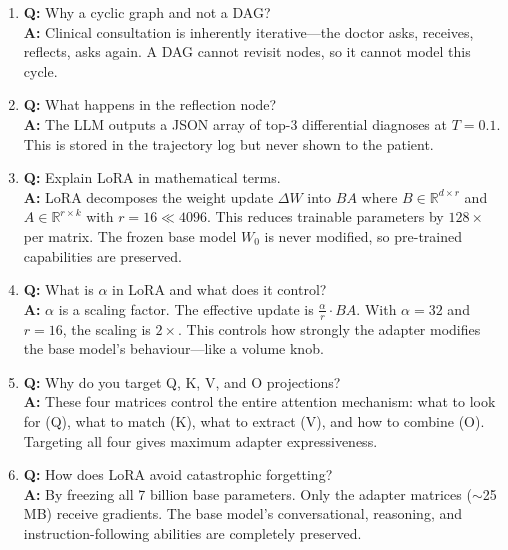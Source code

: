 \begin{vivabox}[\textcolor{white}{Likely Viva Questions}]
\begin{enumerate}
    \item \textbf{Q:} Why a cyclic graph and not a DAG?\\
    \textbf{A:} Clinical consultation is inherently iterative---the doctor asks, receives, reflects, asks again. A DAG cannot revisit nodes, so it cannot model this cycle.

    \item \textbf{Q:} What happens in the reflection node?\\
    \textbf{A:} The LLM outputs a JSON array of top-3 differential diagnoses at $T = 0.1$. This is stored in the trajectory log but never shown to the patient.

    \item \textbf{Q:} Explain LoRA in mathematical terms.\\
    \textbf{A:} LoRA decomposes the weight update $\Delta W$ into $BA$ where $B \in \mathbb{R}^{d \times r}$ and $A \in \mathbb{R}^{r \times k}$ with $r = 16 \ll 4096$. This reduces trainable parameters by $128\times$ per matrix. The frozen base model $W_0$ is never modified, so pre-trained capabilities are preserved.

    \item \textbf{Q:} What is $\alpha$ in LoRA and what does it control?\\
    \textbf{A:} $\alpha$ is a scaling factor. The effective update is $\frac{\alpha}{r} \cdot BA$. With $\alpha = 32$ and $r = 16$, the scaling is $2\times$. This controls how strongly the adapter modifies the base model's behaviour---like a volume knob.

    \item \textbf{Q:} Why do you target Q, K, V, and O projections?\\
    \textbf{A:} These four matrices control the entire attention mechanism: what to look for (Q), what to match (K), what to extract (V), and how to combine (O). Targeting all four gives maximum adapter expressiveness.

    \item \textbf{Q:} How does LoRA avoid catastrophic forgetting?\\
    \textbf{A:} By freezing all 7 billion base parameters. Only the adapter matrices ($\sim$25 MB) receive gradients. The base model's conversational, reasoning, and instruction-following abilities are completely preserved.


\end{enumerate}
\end{vivabox}
